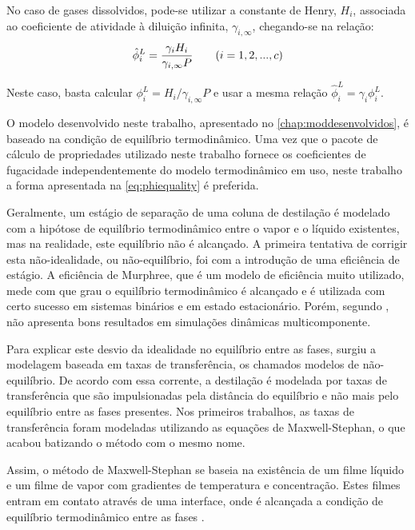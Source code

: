 No caso de gases dissolvidos, pode-se utilizar a constante de Henry, $H_i$, associada ao coeficiente de
atividade à diluição infinita, $\gamma_{i,\infty}$, chegando-se na relação:
\begin{equation}
\hat{\phi}^L_i = \dfrac{\gamma_i H_i}{\gamma_{i,\infty} P} \qquad (i = 1,2,...,c) \\
\label{eq:gammadefinitionHenry}
\end{equation}

Neste caso, basta calcular $\phi^L_i = H_i / \gamma_{i,\infty} P$ e usar a mesma relação
$\hat{\phi}^L_i = \gamma_i \phi^L_i$.

O modelo desenvolvido neste trabalho, apresentado no \autoref{chap:moddesenvolvidos}, é baseado na condição de equilíbrio
termodinâmico.
Uma vez que o pacote de cálculo de propriedades utilizado neste trabalho
fornece os coeficientes de fugacidade independentemente do modelo termodinâmico
em uso, neste trabalho a forma apresentada na \autoref{eq:phiequality} é
preferida.

Geralmente, um estágio de separação de uma coluna de destilação é modelado com a hipótose de equilíbrio  termodinâmico
entre o vapor e o líquido existentes, mas na realidade, este equilíbrio não é alcançado. A primeira tentativa de corrigir
esta não-idealidade, ou não-equilíbrio, foi com a introdução de uma eficiência de estágio.
A eficiência de Murphree, que é um modelo de
eficiência muito utilizado, mede com que grau o equilíbrio termodinâmico é alcançado e é utilizada com certo sucesso em
sistemas binários e em estado estacionário. Porém, segundo , não apresenta bons resultados
em simulações dinâmicas multicomponente.

Para explicar este desvio da idealidade no equilíbrio entre as fases, surgiu a
modelagem baseada em taxas de transferência, os chamados modelos de não-equilíbrio. De acordo com
essa corrente, a destilação é modelada por taxas de transferência que são
impulsionadas pela distância do equilíbrio e não mais pelo equilíbrio entre as
fases presentes. Nos primeiros trabalhos, as taxas de transferência foram modeladas
utilizando as equações de Maxwell-Stephan, o que acabou batizando o método
com o mesmo nome.

Assim, o método de Maxwell-Stephan se baseia na existência de um filme líquido e um filme de vapor com gradientes de
temperatura e concentração. Estes filmes entram em contato através de uma interface, onde é alcançada a condição de
equilíbrio termodinâmico entre as fases \cite{Koeijer:2004}.

